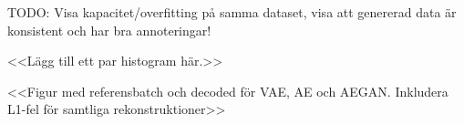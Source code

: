 
TODO: Visa kapacitet/overfitting på samma dataset, visa att genererad data är konsistent och har bra annoteringar!

<<Lägg till ett par histogram här.>>

<<Figur med referensbatch och decoded för VAE, AE och AEGAN. Inkludera L1-fel för samtliga rekonstruktioner>>


